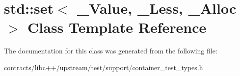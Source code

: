 \hypertarget{classstd_1_1set}{}\section{std\+:\+:set$<$ \+\_\+\+Value, \+\_\+\+Less, \+\_\+\+Alloc $>$ Class Template Reference}
\label{classstd_1_1set}


The documentation for this class was generated from the following file\+:\begin{DoxyCompactItemize}
\item 
contracts/libc++/upstream/test/support/container\+\_\+test\+\_\+types.\+h\end{DoxyCompactItemize}
